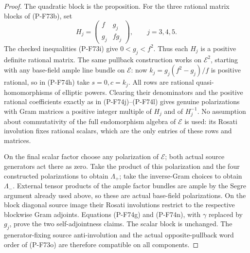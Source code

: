 \begin{proof}
The quadratic block is the proposition.  For the three
rational matrix blocks of (P-F73b), set
\[
 H_j=\begin{pmatrix}f&g_j\\g_j&fg_j\end{pmatrix},
              \qquad j=3,4,5.
                                                               \tag{P-F74p}
\]
The checked inequalities (P-F73i) give $0<g_j<f^2$.
Thus each $H_j$ is a positive definite rational matrix.
The same pullback construction works on $\mathcal E^2$,
starting with any base-field ample line bundle on $\mathcal E$:
now $k_j=g_j(f^2-g_j)/f$ is positive rational, so in
(P-F74h) take $s=0,c=k_j$.  All rows are rational
quasi-homomorphisms of elliptic powers.  Clearing their
denominators and the positive rational coefficients exactly
as in (P-F74j)--(P-F74l) gives genuine polarizations with
Gram matrices a positive integer multiple of $H_j$ and of
$H_j^{-1}$.  No assumption about commutativity of the full
endomorphism algebra of $\mathcal E$ is used: its Rosati
involution fixes rational scalars, which are the only entries
of these rows and matrices.

On the final scalar factor choose any polarization of
$\mathcal E$; both actual source generators act there as zero.
Take the product of this polarization and the four
constructed polarizations to obtain $\Lambda_+$; take the
inverse-Gram choices to obtain $\Lambda_-$.  External tensor
products of the ample factor bundles are ample by the
Segre argument already used above, so these are actual
base-field polarizations.  On the block diagonal source
image their Rosati involutions restrict to the respective
blockwise Gram adjoints.  Equations (P-F74g) and (P-F74n),
with $\gamma$ replaced by $g_j$, prove the two self-adjointness
claims.  The scalar block is unchanged.  The generator-fixing
source anti-involution and the actual opposite-pullback word
order of (P-F73o) are therefore compatible on all components.


\end{proof}
